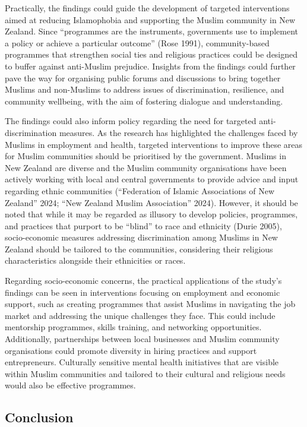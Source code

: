 \documentclass[
]{interact}
\begin{document}
Practically, the findings could guide the development of targeted
interventions aimed at reducing Islamophobia and supporting the Muslim
community in New Zealand. Since ``programmes are the instruments,
governments use to implement a policy or achieve a particular outcome''
(Rose 1991), community-based programmes that strengthen social ties and
religious practices could be designed to buffer against anti-Muslim
prejudice. Insights from the findings could further pave the way for
organising public forums and discussions to bring together Muslims and
non-Muslims to address issues of discrimination, resilience, and
community wellbeing, with the aim of fostering dialogue and
understanding.

The findings could also inform policy regarding the need for targeted
anti-discrimination measures. As the research has highlighted the
challenges faced by Muslims in employment and health, targeted
interventions to improve these areas for Muslim communities should be
prioritised by the government. Muslims in New Zealand are diverse and
the Muslim community organisations have been actively working with local
and central governments to provide advice and input regarding ethnic
communities ({``Federation of Islamic Associations of New Zealand''}
2024; {``New Zealand Muslim Association''} 2024). However, it should be
noted that while it may be regarded as illusory to develop policies,
programmes, and practices that purport to be ``blind'' to race and
ethnicity (Durie 2005), socio-economic measures addressing
discrimination among Muslims in New Zealand should be tailored to the
communities, considering their religious characteristics alongside their
ethnicities or races.

Regarding socio-economic concerns, the practical applications of the
study's findings can be seen in interventions focusing on employment and
economic support, such as creating programmes that assist Muslims in
navigating the job market and addressing the unique challenges they
face. This could include mentorship programmes, skills training, and
networking opportunities. Additionally, partnerships between local
businesses and Muslim community organisations could promote diversity in
hiring practices and support entrepreneurs. Culturally sensitive mental
health initiatives that are visible within Muslim communities and
tailored to their cultural and religious needs would also be effective
programmes.

\subsection{Conclusion}\label{conclusion}
\end{document}
